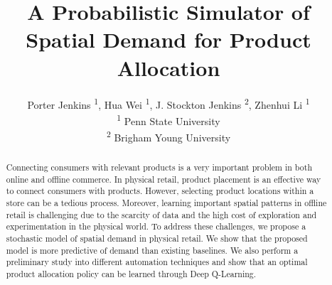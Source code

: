 \documentclass[letterpaper]{article} %
\title{A Probabilistic Simulator of Spatial Demand for Product Allocation}
\author{Porter Jenkins \textsuperscript{\rm 1}, Hua Wei \textsuperscript{\rm 1}, J. Stockton Jenkins \textsuperscript{\rm 2}, Zhenhui Li \textsuperscript{\rm 1} \\ 
\textsuperscript{\rm 1} Penn State University \\
\textsuperscript{\rm 2} Brigham Young University \\%
}
\begin{document}
\maketitle

\begin{abstract}
Connecting consumers with relevant products is a very important problem in both online and offline commerce. In physical retail, product placement is an effective way to connect consumers with products. However, selecting product locations within a store can be a tedious process. Moreover, learning important spatial patterns in offline retail is challenging due to the scarcity of data and the high cost of exploration and experimentation in the physical world. To address these challenges, we propose a stochastic model of spatial demand in physical retail. We show that the proposed model is more predictive of demand than existing baselines. We also perform a preliminary study into different automation techniques and show that an optimal product allocation policy can be learned through Deep Q-Learning. 

\end{abstract}












\end{document}
